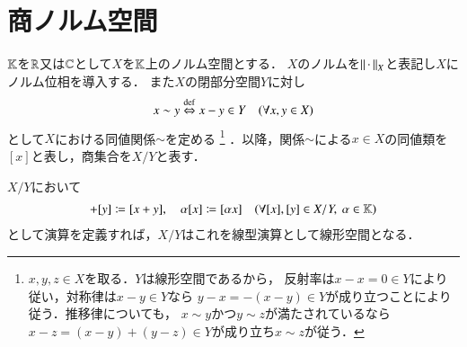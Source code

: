 \chapter{商ノルム空間}
\label{chap:quotient_normed_space}
	$\mathbb{K}$を$\mathbb{R}$又は$\mathbb{C}$として$X$を$\mathbb{K}$上のノルム空間とする．
	$X$のノルムを$\left\|\, \cdot\, \right\|_{X}$と表記し$X$にノルム位相を導入する．
	また$X$の閉部分空間$Y$に対し
	\begin{align}
		x \sim y \overset{\mathrm{def}}{\Leftrightarrow} x - y \in Y \quad (\forall x,y \in X)
	\end{align}
	として$X$における同値関係$\sim$を定める
	\footnote{
		$x,y,z \in X$を取る．$Y$は線形空間であるから，
		反射率は$x - x = 0 \in Y$により従い，対称律は$x - y \in Y$なら
		$y - x = -(x - y) \in Y$が成り立つことにより従う．推移律についても，
		$x \sim y$かつ$y \sim z$が満たされているなら
		$x - z = (x - y) + (y - z) \in Y$が成り立ち$x \sim z$が従う．
	}
	．以降，関係$\sim$による$x \in X$の同値類を$[x]$と表し，商集合を$X/Y$と表す．
	
	\begin{screen}
		\begin{thm}[商集合における線型演算]
			$X/Y$において
			\begin{align}
				[x] + [y] \coloneqq [x + y], \quad
				\alpha [x] \coloneqq [\alpha x] \quad (\forall [x],[y] \in X/Y,\ \alpha \in \K)
				\label{eq:quotient_set_linear_calculation_1}
			\end{align}
			として演算を定義すれば，$X/Y$はこれを線型演算として線形空間となる．
		\end{thm}
	\end{screen}
	
